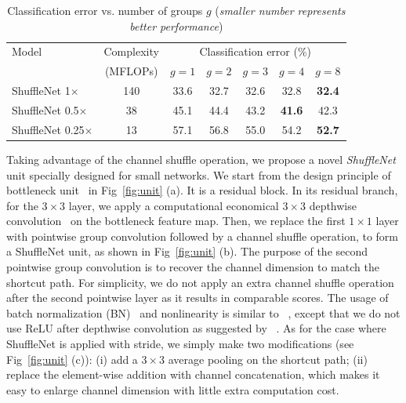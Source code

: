 \documentclass[10pt,twocolumn,letterpaper]{article}
\begin{document}
\begin{table}[t]
	\begin{center}
		\begin{tabular}{l|c|ccccc}
			\hline
			Model & Complexity & \multicolumn{5}{c}{Classification error (\%)} \\
			& (MFLOPs) & $g=1$ & $g=2$ & $g=3$ & $g=4$ & $g=8$ \\
			\hline
			\hline
			ShuffleNet 1$\times$ & 140 & 33.6 & 32.7 & 32.6 & 32.8 & \textbf{32.4} \\
			ShuffleNet 0.5$\times$ & 38	& 45.1 & 44.4 & 43.2 & \textbf{41.6} & 42.3 \\
			ShuffleNet 0.25$\times$ & 13 & 57.1 & 56.8 & 55.0  & 54.2 & \textbf{52.7} \\
			\hline
		\end{tabular}
	\end{center}
	\caption{Classification error vs. number of groups $g$ (\emph{smaller number represents better performance})}
	\label{tbl:groupconv}
\end{table}

Taking advantage of the channel shuffle operation, we propose a novel \emph{ShuffleNet} unit specially designed for small networks. We start from the design principle of bottleneck unit~\cite{he2016deep} in Fig~\ref{fig:unit} (a). It is a residual block. In its residual branch, for the $3\times 3$ layer, we apply a computational economical $3\times 3$ depthwise convolution~\cite{chollet2016xception} on the bottleneck feature map. Then, we replace the first $1\times 1$ layer with pointwise group convolution followed by a channel shuffle operation, to form a ShuffleNet unit, as shown in Fig~\ref{fig:unit} (b). The purpose of the second pointwise group convolution is to recover the channel dimension to match the shortcut path. For simplicity, we do not apply an extra channel shuffle operation after the second pointwise layer as it results in comparable scores. The usage of batch normalization (BN)~\cite{ioffe2015batch} and nonlinearity is similar to ~\cite{he2016deep,xie2016aggregated}, except that we do not use ReLU after depthwise convolution as suggested by ~\cite{chollet2016xception}. As for the case where ShuffleNet is applied with stride, we simply make two modifications (see Fig~\ref{fig:unit} (c)): (i) add a $3\times 3$ average pooling on the shortcut path; (ii) replace the element-wise addition with channel concatenation, which makes it easy to enlarge channel dimension with little extra computation cost. 
\end{document}
